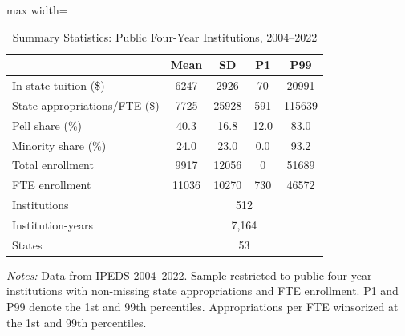 \begin{table}[htbp]
\centering
\caption{Summary Statistics: Public Four-Year Institutions, 2004--2022}
\label{tab:sumstats}
\begin{threeparttable}
\begin{adjustbox}{max width=\textwidth}
\begin{tabular}{lcccc}
\toprule
 & Mean & SD & P1 & P99 \\
\midrule
In-state tuition (\$) & 6247 & 2926 & 70 & 20991 \\
State appropriations/FTE (\$) & 7725 & 25928 & 591 & 115639 \\
Pell share (\%) & 40.3 & 16.8 & 12.0 & 83.0 \\
Minority share (\%) & 24.0 & 23.0 & 0.0 & 93.2 \\
Total enrollment & 9917 & 12056 & 0 & 51689 \\
FTE enrollment & 11036 & 10270 & 730 & 46572 \\
\midrule
Institutions & \multicolumn{4}{c}{512} \\
Institution-years & \multicolumn{4}{c}{7,164} \\
States & \multicolumn{4}{c}{53} \\
\bottomrule
\end{tabular}
\end{adjustbox}
\begin{tablenotes}\small
\item \textit{Notes:} Data from IPEDS 2004--2022. Sample restricted to public four-year institutions with non-missing state appropriations and FTE enrollment. P1 and P99 denote the 1st and 99th percentiles. Appropriations per FTE winsorized at the 1st and 99th percentiles.
\end{tablenotes}
\end{threeparttable}
\end{table}
